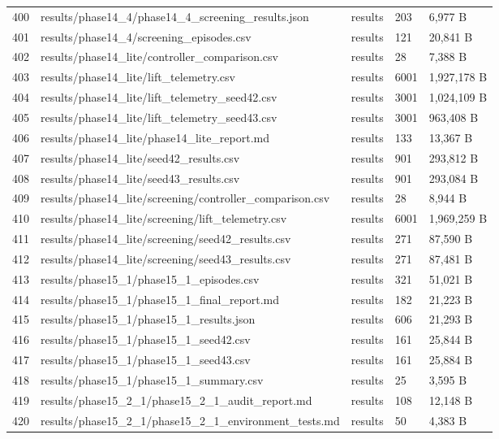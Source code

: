 \documentclass[11pt,a4paper,oneside]{book}
\begin{document}
\begin{longtable}{l l l l l}
400 & results/phase14\_4/phase14\_4\_screening\_results.json & results & 203 & 6,977 B \\
401 & results/phase14\_4/screening\_episodes.csv & results & 121 & 20,841 B \\
402 & results/phase14\_lite/controller\_comparison.csv & results & 28 & 7,388 B \\
403 & results/phase14\_lite/lift\_telemetry.csv & results & 6001 & 1,927,178 B \\
404 & results/phase14\_lite/lift\_telemetry\_seed42.csv & results & 3001 & 1,024,109 B \\
405 & results/phase14\_lite/lift\_telemetry\_seed43.csv & results & 3001 & 963,408 B \\
406 & results/phase14\_lite/phase14\_lite\_report.md & results & 133 & 13,367 B \\
407 & results/phase14\_lite/seed42\_results.csv & results & 901 & 293,812 B \\
408 & results/phase14\_lite/seed43\_results.csv & results & 901 & 293,084 B \\
409 & results/phase14\_lite/screening/controller\_comparison.csv & results & 28 & 8,944 B \\
410 & results/phase14\_lite/screening/lift\_telemetry.csv & results & 6001 & 1,969,259 B \\
411 & results/phase14\_lite/screening/seed42\_results.csv & results & 271 & 87,590 B \\
412 & results/phase14\_lite/screening/seed43\_results.csv & results & 271 & 87,481 B \\
413 & results/phase15\_1/phase15\_1\_episodes.csv & results & 321 & 51,021 B \\
414 & results/phase15\_1/phase15\_1\_final\_report.md & results & 182 & 21,223 B \\
415 & results/phase15\_1/phase15\_1\_results.json & results & 606 & 21,293 B \\
416 & results/phase15\_1/phase15\_1\_seed42.csv & results & 161 & 25,844 B \\
417 & results/phase15\_1/phase15\_1\_seed43.csv & results & 161 & 25,884 B \\
418 & results/phase15\_1/phase15\_1\_summary.csv & results & 25 & 3,595 B \\
419 & results/phase15\_2\_1/phase15\_2\_1\_audit\_report.md & results & 108 & 12,148 B \\
420 & results/phase15\_2\_1/phase15\_2\_1\_environment\_tests.md & results & 50 & 4,383 B \\

\end{longtable}
\end{document}
